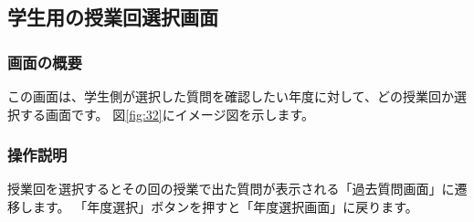 \newpage

\subsection{学生用の授業回選択画面}
\subsubsection{画面の概要}
この画面は、学生側が選択した質問を確認したい年度に対して、どの授業回か選択する画面です。
図\ref{fig:32}にイメージ図を示します。

\subsubsection{操作説明}
授業回を選択するとその回の授業で出た質問が表示される「過去質問画面」に遷移します。
「年度選択」ボタンを押すと「年度選択画面」に戻ります。




